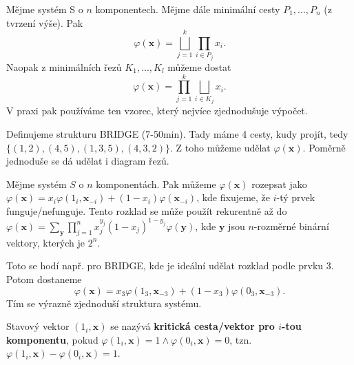 \begin{theorem}
	Mějme systém S o $n$ komponentech. Mějme dále minimální cesty $P_1,...,P_n$ (z tvrzení výše). Pak $$ \varphi(\textbf{x})=\bigsqcup_{j=1}^k \prod_{i\in P_j} x_i.$$
	Naopak z minimálních řezů $K_1,...,K_l$ můžeme dostat
	$$ \varphi(\textbf{x})= \prod_{j=1}^k \bigsqcup_{i\in K_j} x_i.$$
	V praxi pak používáme ten vzorec, který nejvíce zjednodušuje výpočet.
\end{theorem}

\begin{corollary}
	Definujeme strukturu BRIDGE (7-50min). Tady máme 4 cesty, kudy projít, tedy $\{(1,2),(4,5),(1,3,5),(4,3,2)\}$. Z toho můžeme udělat $\varphi(\textbf{x})$. Poměrně jednoduše se dá udělat i diagram řezů.
\end{corollary}

\begin{theorem}
	Mějme systém $S$ o $n$ komponentách. Pak můžeme $\varphi(\textbf{x})$ rozepsat jako $\varphi(\textbf{x})=x_i\varphi(1_i,\textbf{x}_{-i})+(1-x_i)\varphi(\textbf{x}_{-i})$, kde fixujeme, že $i$-tý prvek funguje/nefunguje. Tento rozklad se může použít rekurentně až do $\varphi(\textbf{x})=\sum_{\textbf{y}}\prod_{j=1}^n x_j^{y_j}(1-x_j)^{1-y_j}\varphi(\textbf{y})$, kde $\textbf{y}$ jsou $n$-rozměrné binární vektory, kterých je $2^n$.
\end{theorem}

Toto se hodí např. pro BRIDGE, kde je ideální udělat rozklad podle prvku 3. Potom dostaneme 
$$ \varphi(\textbf{x})=x_3\varphi(1_3,\textbf{x}_{-3})+(1-x_3)\varphi(0_3,\textbf{x}_{-3}). $$
Tím se výrazně zjednoduší struktura systému.

\begin{define}
	Stavový vektor $(1_i,\textbf{x})$ se nazývá \textbf{kritická cesta/vektor pro $i$-tou komponentu}, pokud $\varphi(1_i,\textbf{x})=1\wedge \varphi(0_i,\textbf{x})=0 $, tzn. $\varphi(1_i,\textbf{x})-\varphi(0_i,\textbf{x})=1$.
\end{define}